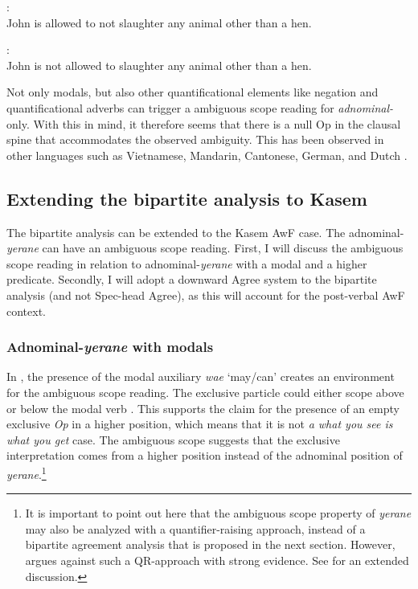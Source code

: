 \documentclass[output=paper,colorlinks,citecolor=brown,draftmode
]{langscibook}
\begin{document}
\ea \label{ex:Aremu:The readings}
\begin{xlist}
: \\ John is allowed to not slaughter any animal other than a hen.

: \\ John is not allowed to slaughter any animal other than a hen.
\end{xlist}

\z

Not only modals, but also other quantificational elements like negation and quantificational adverbs can trigger a ambiguous scope reading for \textit{adnominal-}only.  With this in mind, it therefore seems that there is a null Op in the clausal spine that accommodates the observed ambiguity. This has been observed in other languages such as Vietnamese, Mandarin, Cantonese, German, and Dutch \citep[see a.o.,][]{bayer1996directionality, bayer1999bound, lee2004syntax, barbiers2010focus, barbiers2014syntactic, hole2017crosslinguistic, sun2021bipartite, Yip2024agreeing}.


\subsection{Extending the bipartite analysis to Kasem}

The bipartite analysis can be extended to the Kasem AwF case. The adnominal-\textit{yerane} can have an ambiguous scope reading. First, I will discuss the ambiguous scope reading in relation to adnominal-\textit{yerane} with a modal and a higher predicate. Secondly, I will adopt a downward Agree system to the bipartite analysis (and not Spec-head Agree), as this will account for the post-verbal AwF context.

\subsubsection{Adnominal-\textit{yerane} with modals}

In , the presence of the modal auxiliary \textit{wae} `may/can' creates an environment for the ambiguous scope reading. The exclusive particle could either scope above or below the modal verb . This supports the claim for the presence of an empty exclusive \textit{Op} in a higher position, which means that it is not \textit{a what you see is what you get} case. The ambiguous scope suggests that the exclusive interpretation comes from a higher position instead of the adnominal position of \textit{yerane}.\footnote{It is important to point out here that the ambiguous scope property of \textit{yerane} may also be analyzed with a quantifier-raising approach, instead of a bipartite agreement analysis that is proposed in the next section. However, \citet{aremu2024towards} argues against such a QR-approach with strong evidence. See \citet{aremu2024towards} for an extended discussion.}
\end{document}
